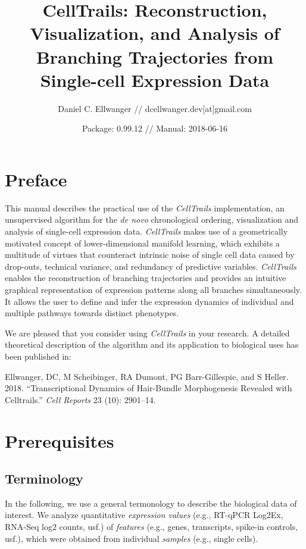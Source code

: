 \documentclass[]{book}
\title{CellTrails: Reconstruction, Visualization, and Analysis of Branching
Trajectories from Single-cell Expression Data}
\author{Daniel C. Ellwanger // dcellwanger.dev{[}at{]}gmail.com}
\date{Package: 0.99.12 // Manual: 2018-06-16}
\theoremstyle{definition}
\theoremstyle{definition}
\theoremstyle{definition}
\theoremstyle{remark}
\begin{document}
\maketitle

{
\setcounter{tocdepth}{1}
\tableofcontents
}
\chapter*{Preface}\label{preface}

This manual describes the practical use of the \emph{CellTrails}
implementation, an unsupervised algorithm for the \emph{de novo}
chronological ordering, visualization and analysis of single-cell
expression data. \emph{CellTrails} makes use of a geometrically
motivated concept of lower-dimensional manifold learning, which exhibits
a multitude of virtues that counteract intrinsic noise of single cell
data caused by drop-outs, technical variance, and redundancy of
predictive variables. \emph{CellTrails} enables the reconstruction of
branching trajectories and provides an intuitive graphical
representation of expression patterns along all branches simultaneously.
It allows the user to define and infer the expression dynamics of
individual and multiple pathways towards distinct phenotypes.

We are pleased that you consider using \emph{CellTrails} in your
research. A detailed theoretical description of the algorithm and its
application to biological uses has been published in:

Ellwanger, DC, M Scheibinger, RA Dumont, PG Barr-Gillespie, and S
Heller. 2018. ``Transcriptional Dynamics of Hair-Bundle Morphogenesis
Revealed with Celltrails.'' \emph{Cell Reports} 23 (10): 2901--14.

\chapter{Prerequisites}\label{prerequisites}

\section{Terminology}\label{terminology}

In the following, we use a general termonology to describe the
biological data of interest. We analyze quantitative \emph{expression
values} (e.g., RT-qPCR Log2Ex, RNA-Seq log2 counts, usf.) of
\emph{features} (e.g., genes, transcripts, spike-in controls, usf.),
which were obtained from individual \emph{samples} (e.g., single cells).
\end{document}
